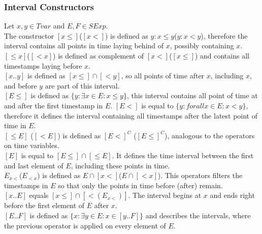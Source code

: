 	\subsubsection{Interval Constructors}
		Let $x, y\in Tvar$ and $E, F\in SExp$.\\
		The constructor $[x\leq]$($[x<]$) is defined as ${y: x \leq y}$(${y: x < y}$), therefore the interval contains all points in time laying behind of $x$, possibly containing $x$.\\
		$[\leq x]$($[< x]$) is defined as complement of $[x<]$($[x\leq]$) and contains all timestamps laying before $x$.\\
		$[x..y]$ is defined as $[x\leq]\cap[<y]$, so all points of time after $x$, including $x$, and before $y$ are part of this interval.\\
		$[E \leq]$ is defined as $\{y : \exists x \in E : x \leq y\}$, this interval contains all point of time at and after the first timestamp in $E$. $[E<]$ is equal to $\{y : forall x \in E : x < y\}$, therefore it defines the interval containing all timestamps after the latest point of time in $E$.\\
		$[\leq E]$ ($[< E]$) is defined as $[E<]^C$ ($[E\leq]^C$), analogous to the operators on time variables.\\
		$[E]$ is equal to $[E\leq]\cap[\leq E]$. It defines the time interval between the first and last element of $E$, including these points in time.\\
		$E_{x<}$($E_{<x}$) is defined as $E\cap [x<]$($E\cap [<x]$). This operators filters the timestamps in $E$ so that only the points in time before (after) remain.\\
		$[x..E]$ equals $[x\leq]\cap[<(E_{x<})]$. The interval begins at $x$ and ends right before the first element of $E$ after $x$.\\
		$[E..F]$ is defined as $\{x:\exists y\in E:x\in[y..F]\}$ and describes the intervals, where the previous operator is applied on every element of $E$.\\
